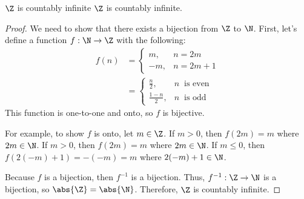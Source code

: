 \documentclass[letterpaper,12pt]{report}
\begin{document}
\begin{exbox}{$\Z$ is countably infinite}{}
    $\Z$ is countably infinite.
    \tcblower
    \begin{proof}
        We need to show that there exists a bijection from $\Z$ to $\N$. First, let's define a function $f : \N \to \Z$ with the following:
        \begin{align*}
            f(n) &= {\begin{cases}
            m, & n = 2m \\
            -m, & n = 2m+1
        \end{cases}} \\
        &= {\begin{cases}
            \frac{n}{2}, & n\ \text{ is even} \\
            \frac{1-n}{2}, & n\ \text{ is odd}
            \end{cases}
        }
        \end{align*}
        This function is one-to-one and onto, so $f$ is bijective.

        For example, to show $f$ is onto, let $m \in \Z$. If $m > 0$, then $f(2m) = m$ where $2m \in \N$. If $m > 0$, then $f(2m) = m$ where $2m \in \N$. If $m \leq 0$, then $f(2(-m) + 1) = -(-m) = m$ where $2(-m)+1 \in \N$.

        Because $f$ is a bijection, then $f^{-1}$ is a bijection. Thus, $f^{-1} : \Z \to \N$ is a bijection, so $\abs{\Z} = \abs{\N}$. Therefore, $\Z$ is countably infinite.
    \end{proof}
\end{exbox}
\end{document}
